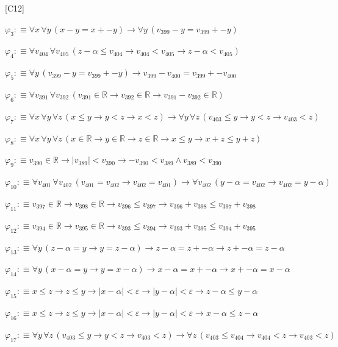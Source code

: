 \begin{fullproof}{[C12]}
\begin{abbrevlist}
\item $\varphi_{3} :\equiv \forall x\,\forall y\,(x - y = x + -y) \to \forall y\,(v_{399} - y = v_{399} + -y)$
\item $\varphi_{4} :\equiv \forall v_{404}\,\forall v_{405}\,(z - \alpha \leq v_{404} \to v_{404} < v_{405} \to z - \alpha < v_{405})$
\item $\varphi_{5} :\equiv \forall y\,(v_{399} - y = v_{399} + -y) \to v_{399} - v_{400} = v_{399} + -v_{400}$
\item $\varphi_{6} :\equiv \forall v_{391}\,\forall v_{392}\,(v_{391} \in \mathbb{R} \to v_{392} \in \mathbb{R} \to v_{391} - v_{392} \in \mathbb{R})$
\item $\varphi_{7} :\equiv \forall x\,\forall y\,\forall z\,(x \leq y \to y < z \to x < z) \to \forall y\,\forall z\,(v_{403} \leq y \to y < z \to v_{403} < z)$
\item $\varphi_{8} :\equiv \forall x\,\forall y\,\forall z\,(x \in \mathbb{R} \to y \in \mathbb{R} \to z \in \mathbb{R} \to x \leq y \to x + z \leq y + z)$
\item $\varphi_{9} :\equiv v_{390} \in \mathbb{R} \to \lvert v_{389} \rvert < v_{390} \to -v_{390} < v_{389} \land v_{389} < v_{390}$
\item $\varphi_{10} :\equiv \forall v_{401}\,\forall v_{402}\,(v_{401} = v_{402} \to v_{402} = v_{401}) \to \forall v_{402}\,(y - \alpha = v_{402} \to v_{402} = y - \alpha)$
\item $\varphi_{11} :\equiv v_{397} \in \mathbb{R} \to v_{398} \in \mathbb{R} \to v_{396} \leq v_{397} \to v_{396} + v_{398} \leq v_{397} + v_{398}$
\item $\varphi_{12} :\equiv v_{394} \in \mathbb{R} \to v_{395} \in \mathbb{R} \to v_{393} \leq v_{394} \to v_{393} + v_{395} \leq v_{394} + v_{395}$
\item $\varphi_{13} :\equiv \forall y\,(z - \alpha = y \to y = z - \alpha) \to z - \alpha = z + -\alpha \to z + -\alpha = z - \alpha$
\item $\varphi_{14} :\equiv \forall y\,(x - \alpha = y \to y = x - \alpha) \to x - \alpha = x + -\alpha \to x + -\alpha = x - \alpha$
\item $\varphi_{15} :\equiv x \leq z \to z \leq y \to \lvert x - \alpha \rvert < \varepsilon \to \lvert y - \alpha \rvert < \varepsilon \to z - \alpha \leq y - \alpha$
\item $\varphi_{16} :\equiv x \leq z \to z \leq y \to \lvert x - \alpha \rvert < \varepsilon \to \lvert y - \alpha \rvert < \varepsilon \to x - \alpha \leq z - \alpha$
\item $\varphi_{17} :\equiv \forall y\,\forall z\,(v_{403} \leq y \to y < z \to v_{403} < z) \to \forall z\,(v_{403} \leq v_{404} \to v_{404} < z \to v_{403} < z)$

\end{abbrevlist}
\end{fullproof}
